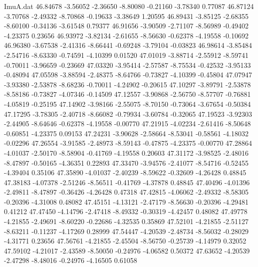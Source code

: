 \begin{filecontents}{ImuA.dat}
  46.84678   -3.56052   -2.36650   -8.80080   -0.21160   -3.78340    0.77087
  46.87124   -3.70768   -2.49332   -8.70868   -0.19633   -3.38649    1.20595
  46.89431   -3.85125   -2.68355   -8.60100   -0.34136   -3.61548    0.79377
  46.91656   -3.90509   -2.71107   -8.56989   -0.49402   -4.23375    0.23656
  46.93972   -3.82134   -2.61655   -8.56630   -0.62378   -4.19558   -0.10692
  46.96380   -3.67538   -2.41316   -8.66441   -0.69248   -3.79104   -0.03823
  46.98614   -3.85484   -2.54716   -8.63330   -0.74591   -4.10399    0.01520
  47.01019   -3.88714   -2.55912   -8.59741   -0.70011   -3.96659   -0.23669
  47.03320   -3.95414   -2.57587   -8.75534   -0.42532   -3.95133   -0.48094
  47.05598   -3.88594   -2.48375   -8.64766   -0.73827   -4.10399   -0.45804
  47.07947   -3.93380   -2.53878   -8.68236   -0.70011   -4.24902   -0.20615
  47.10297   -3.89791   -2.53878   -8.58186   -0.73827   -4.07346   -0.14509
  47.12557   -3.90868   -2.56750   -8.57707   -0.76881   -4.05819   -0.25195
  47.14902   -3.98166   -2.55075   -8.70150   -0.73064   -3.67654   -0.50384
  47.17295   -3.78305   -2.40718   -8.66082   -0.79934   -3.60784   -0.32065
  47.19523   -3.92303   -2.44905   -8.64646   -0.62378   -4.19558   -0.00770
  47.21915   -4.02234   -2.61416   -8.50648   -0.60851   -4.23375    0.09153
  47.24231   -3.90628   -2.58664   -8.53041   -0.58561   -4.18032   -0.02296
  47.26554   -3.91585   -2.48973   -8.59143   -0.47875   -4.23375   -0.00770
  47.28864   -4.01037   -2.50170   -8.58904   -0.41769   -4.19558    0.20603
  47.31172   -3.98525   -2.48016   -8.47897   -0.50165   -4.36351    0.22893
  47.33470   -3.94576   -2.41077   -8.54716   -0.52455   -4.39404    0.35106
  47.35890   -4.01037   -2.40239   -8.59622   -0.32609   -4.26428    0.48845
  47.38183   -4.07378   -2.51246   -8.56511   -0.41769   -4.37878    0.48845
  47.40496   -4.01396   -2.49811   -8.47897   -0.36426   -4.26428    0.47318
  47.42815   -4.06062   -2.49332   -8.58305   -0.20396   -4.31008    0.48082
  47.45151   -4.13121   -2.47179   -8.56630   -0.20396   -4.29481    0.41212
  47.47450   -4.14796   -2.47418   -8.49332   -0.30319   -4.42457    0.48082
  47.49778   -4.21855   -2.49691   -8.60220   -0.22686   -4.32535    0.35869
  47.52101   -4.21855   -2.51127   -8.63211   -0.11237   -4.17269    0.28999
  47.54447   -4.20539   -2.48734   -8.56032   -0.28029   -4.31771    0.23656
  47.56761   -4.21855   -2.45504   -8.56750   -0.25739   -4.14979    0.32052
  47.59102   -4.21017   -2.43589   -8.50050   -0.24976   -4.06582    0.50372
  47.63652   -4.20539   -2.47298   -8.48016   -0.24976   -4.16505    0.61058

\end{filecontents}
